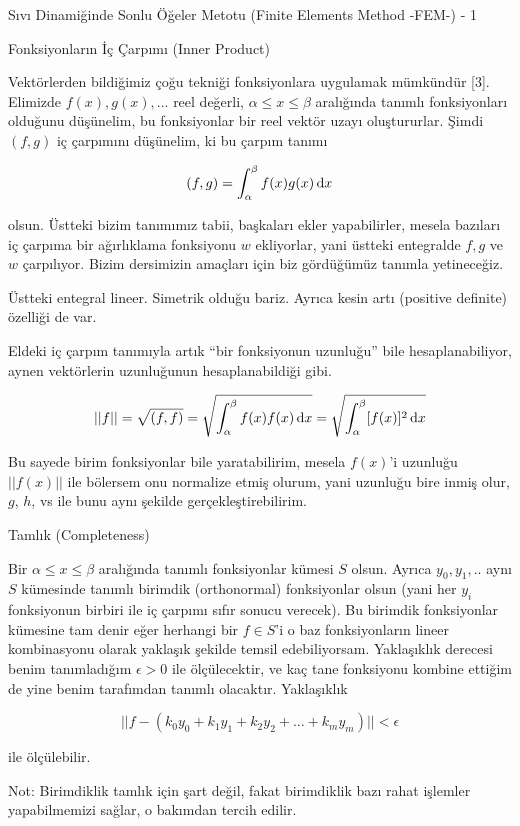 \documentclass[12pt,fleqn]{article}\usepackage{../../common}
\begin{document}
Sıvı Dinamiğinde Sonlu Öğeler Metotu (Finite Elements Method -FEM-) - 1

Fonksiyonların İç Çarpımı (Inner Product)

Vektörlerden bildiğimiz çoğu tekniği fonksiyonlara uygulamak mümkündür [3].
Elimizde $f(x), g(x), ...$ reel değerli, $\alpha \le x \le \beta$ aralığında
tanımlı fonksiyonları olduğunu düşünelim, bu fonksiyonlar bir reel vektör uzayı
oluştururlar. Şimdi $(f,g)$ iç çarpımını düşünelim, ki bu çarpım tanımı

$$
(f,g) = \int _{\alpha}^{\beta} f(x) g(x) \,\mathrm{d} x
$$

olsun. Üstteki bizim tanımımız tabii, başkaları ekler yapabilirler, mesela
bazıları iç çarpıma bir ağırlıklama fonksiyonu $w$ ekliyorlar, yani üstteki
entegralde $f,g$ ve $w$ çarpılıyor. Bizim dersimizin amaçları için biz
gördüğümüz tanımla yetineceğiz.

Üstteki entegral lineer. Simetrik olduğu bariz. Ayrıca kesin artı (positive
definite) özelliği de var.

Eldeki iç çarpım tanımıyla artık ``bir fonksiyonun uzunluğu'' bile
hesaplanabiliyor, aynen vektörlerin uzunluğunun hesaplanabildiği gibi.

$$
|| f || = \sqrt{ (f,f) } =
\sqrt{\int_{\alpha}^{\beta} f(x) f(x) \,\mathrm{d} x } =
\sqrt{\int_{\alpha}^{\beta} [f(x)]^2 \,\mathrm{d} x }
$$

Bu sayede birim fonksiyonlar bile yaratabilirim, mesela $f(x)$'i uzunluğu
$||f(x)||$ ile bölersem onu normalize etmiş olurum, yani uzunluğu bire inmiş
olur, $g$, $h$, vs ile bunu aynı şekilde gerçekleştirebilirim.

Tamlık (Completeness)

Bir $\alpha \le x \le \beta$ aralığında tanımlı fonksiyonlar kümesi $S$ olsun.
Ayrıca $y_0,y_1,..$ aynı $S$ kümesinde tanımlı birimdik (orthonormal)
fonksiyonlar olsun (yani her $y_i$ fonksiyonun birbiri ile iç çarpımı sıfır
sonucu verecek). Bu birimdik fonksiyonlar kümesine tam denir eğer herhangi bir
$f \in S$'i o baz fonksiyonların lineer kombinasyonu olarak yaklaşık şekilde
temsil edebiliyorsam. Yaklaşıklık derecesi benim tanımladığım $\epsilon > 0$ ile
ölçülecektir, ve kaç tane fonksiyonu kombine ettiğim de yine benim tarafımdan
tanımlı olacaktır. Yaklaşıklık

$$
|| f - (k_0 y_0 + k_1 y_1 + k_2 y_2 + ... + k_m y_m)  || < \epsilon
$$

ile ölçülebilir.

Not: Birimdiklik tamlık için şart değil, fakat birimdiklik bazı rahat işlemler
yapabilmemizi sağlar, o bakımdan tercih edilir.
\end{document}
